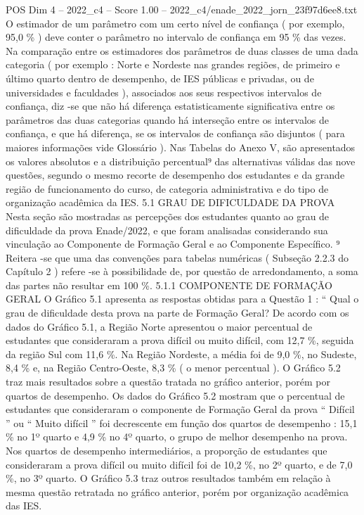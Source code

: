 \begin{textsample}{POS Dim 4 – 2022\_c4 – Score 1.00 – 2022\_c4/enade\_2022\_jorn\_23f97d6ee8.txt}
O estimador de um parâmetro com um certo nível de confiança ( por exemplo, 95,0 \% ) deve conter o parâmetro no intervalo de confiança em 95 \% das vezes.
Na comparação entre os estimadores dos parâmetros de duas classes de uma dada categoria ( por exemplo : Norte e Nordeste nas grandes regiões, de primeiro e último quarto dentro de desempenho, de IES públicas e privadas, ou de universidades e faculdades ), associados aos seus respectivos intervalos de confiança, diz -se que não há diferença estatisticamente significativa entre os parâmetros das duas categorias quando há interseção entre os intervalos de confiança, e que há diferença, se os intervalos de confiança são disjuntos ( para maiores informações vide Glossário ).
Nas Tabelas do Anexo V, são apresentados os valores absolutos e a distribuição percentual⁹ das alternativas válidas das nove questões, segundo o mesmo recorte de desempenho dos estudantes e da grande região de funcionamento do curso, de categoria administrativa e do tipo de organização acadêmica da IES. 5.1 GRAU DE DIFICULDADE DA PROVA Nesta seção são mostradas as percepções dos estudantes quanto ao grau de dificuldade da prova Enade/2022, e que foram analisadas considerando sua vinculação ao Componente de Formação Geral e ao Componente Específico. ⁹ Reitera -se que uma das convenções para tabelas numéricas ( Subseção 2.2.3 do Capítulo 2 ) refere -se à possibilidade de, por questão de arredondamento, a soma das partes não resultar em 100 \%. 5.1.1 COMPONENTE DE FORMAÇÃO GERAL O Gráfico 5.1 apresenta as respostas obtidas para a Questão 1 : “ Qual o grau de dificuldade desta prova na parte de Formação Geral?
De acordo com os dados do Gráfico 5.1, a Região Norte apresentou o maior percentual de estudantes que consideraram a prova difícil ou muito difícil, com 12,7 \%, seguida da região Sul com 11,6 \%.
Na Região Nordeste, a média foi de 9,0 \%, no Sudeste, 8,4 \% e, na Região Centro-Oeste, 8,3 \% ( o menor percentual ).
O Gráfico 5.2 traz mais resultados sobre a questão tratada no gráfico anterior, porém por quartos de desempenho.
Os dados do Gráfico 5.2 mostram que o percentual de estudantes que consideraram o componente de Formação Geral da prova “ Difícil ” ou “ Muito difícil ” foi decrescente em função dos quartos de desempenho : 15,1 \% no 1º quarto e 4,9 \% no 4º quarto, o grupo de melhor desempenho na prova.
Nos quartos de desempenho intermediários, a proporção de estudantes que consideraram a prova difícil ou muito difícil foi de 10,2 \%, no 2º quarto, e de 7,0 \%, no 3º quarto.
O Gráfico 5.3 traz outros resultados também em relação à mesma questão retratada no gráfico anterior, porém por organização acadêmica das IES.

\end{textsample}
